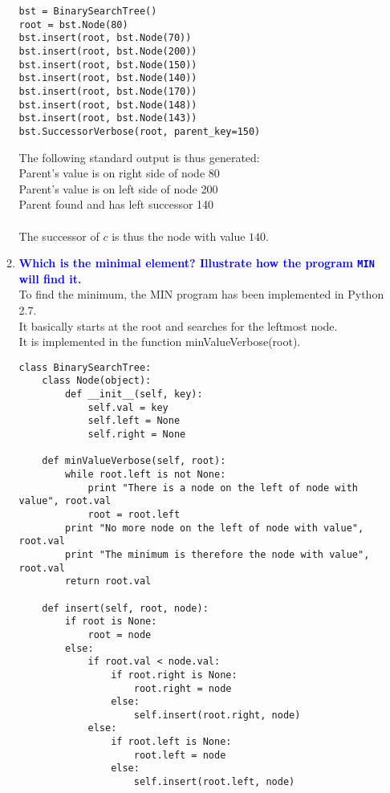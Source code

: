 \documentclass[11pt]{article}
\begin{document}
\begin{enumerate}
\begin{enumerate}
\begin{verbatim}
bst = BinarySearchTree()
root = bst.Node(80)
bst.insert(root, bst.Node(70))
bst.insert(root, bst.Node(200))
bst.insert(root, bst.Node(150))
bst.insert(root, bst.Node(140))
bst.insert(root, bst.Node(170))
bst.insert(root, bst.Node(148))
bst.insert(root, bst.Node(143))
bst.SuccessorVerbose(root, parent_key=150)
        \end{verbatim}
        The following standard output is thus generated:
        \\ Parent's value is on right side of node 80
        \\ Parent's value is on left side of node 200
        \\ Parent found and has left successor 140
        \\\\ The successor of $c$ is thus the node with value $140$.
    \item \textbf{\textcolor{blue}{Which is the minimal element? Illustrate how the program {\tt MIN} will find it.}}
        \\ To find the minimum, the MIN program has been implemented in Python 2.7.
        \\ It basically starts at the root and searches for the leftmost node.
        \\ It is implemented in the function minValueVerbose(root).
        \begin{verbatim}
class BinarySearchTree:
    class Node(object):
        def __init__(self, key):
            self.val = key
            self.left = None
            self.right = None
        
    def minValueVerbose(self, root):
        while root.left is not None:
            print "There is a node on the left of node with value", root.val
            root = root.left    
        print "No more node on the left of node with value", root.val
        print "The minimum is therefore the node with value", root.val
        return root.val
        
    def insert(self, root, node):
        if root is None:
            root = node
        else:
            if root.val < node.val:
                if root.right is None:
                    root.right = node
                else:
                    self.insert(root.right, node)
            else:
                if root.left is None:
                    root.left = node
                else:
                    self.insert(root.left, node)
            

\end{verbatim}
\end{enumerate}
\end{enumerate}
\end{document}
